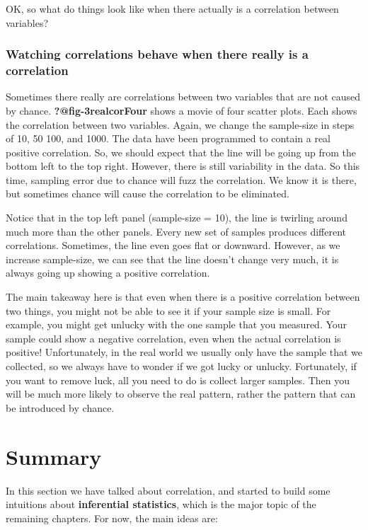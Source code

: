 \documentclass[
  letterpaper,
  DIV=11,
  numbers=noendperiod]{scrreprt}
\begin{document}
OK, so what do things look like when there actually is a correlation
between variables?

\subsubsection{Watching correlations behave when there really is a
correlation}\label{watching-correlations-behave-when-there-really-is-a-correlation}

Sometimes there really are correlations between two variables that are
not caused by chance. \textbf{?@fig-3realcorFour} shows a movie of four
scatter plots. Each shows the correlation between two variables. Again,
we change the sample-size in steps of 10, 50 100, and 1000. The data
have been programmed to contain a real positive correlation. So, we
should expect that the line will be going up from the bottom left to the
top right. However, there is still variability in the data. So this
time, sampling error due to chance will fuzz the correlation. We know it
is there, but sometimes chance will cause the correlation to be
eliminated.

Notice that in the top left panel (sample-size = 10), the line is
twirling around much more than the other panels. Every new set of
samples produces different correlations. Sometimes, the line even goes
flat or downward. However, as we increase sample-size, we can see that
the line doesn't change very much, it is always going up showing a
positive correlation.

The main takeaway here is that even when there is a positive correlation
between two things, you might not be able to see it if your sample size
is small. For example, you might get unlucky with the one sample that
you measured. Your sample could show a negative correlation, even when
the actual correlation is positive! Unfortunately, in the real world we
usually only have the sample that we collected, so we always have to
wonder if we got lucky or unlucky. Fortunately, if you want to remove
luck, all you need to do is collect larger samples. Then you will be
much more likely to observe the real pattern, rather the pattern that
can be introduced by chance.

\section{Summary}\label{summary-1}

In this section we have talked about correlation, and started to build
some intuitions about \textbf{inferential statistics}, which is the
major topic of the remaining chapters. For now, the main ideas are:
\end{document}

